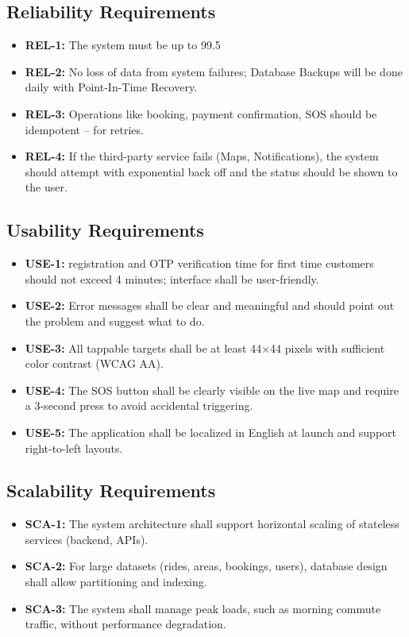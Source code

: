 \subsection{Reliability Requirements}
\begin{itemize}
\item \textbf{REL-1:} The system must be up to 99.5%
\item \textbf{REL-2:} No loss of data from system failures; Database Backups will be done daily with Point-In-Time Recovery.
\item \textbf{REL-3:} Operations like booking, payment confirmation, SOS should be idempotent – for retries.
\item \textbf{REL-4:} If the third-party service fails (Maps, Notifications), the system should attempt with exponential back off and the status should be shown to the user.
\end{itemize}

\subsection{Usability Requirements}
\begin{itemize}
\item \textbf{USE-1:} registration and OTP verification time for first time customers should not exceed 4 minutes; interface shall be user-friendly.
\item \textbf{USE-2:} Error messages shall be clear and meaningful and should point out the problem and suggest what to do.
\item \textbf{USE-3:} All tappable targets shall be at least 44×44 pixels with sufficient color contrast (WCAG AA).
\item \textbf{USE-4:} The SOS button shall be clearly visible on the live map and require a 3-second press to avoid accidental triggering.
\item \textbf{USE-5:} The application shall be localized in English at launch and support right-to-left layouts.
\end{itemize}

\subsection{Scalability Requirements}
\begin{itemize}
\item \textbf{SCA-1:} The system architecture shall support horizontal scaling of stateless services (backend, APIs).
\item \textbf{SCA-2:} For large datasets (rides, areas, bookings, users), database design shall allow partitioning and indexing.
\item \textbf{SCA-3:} The system shall manage peak loads, such as morning commute traffic, without performance degradation.
\end{itemize}

